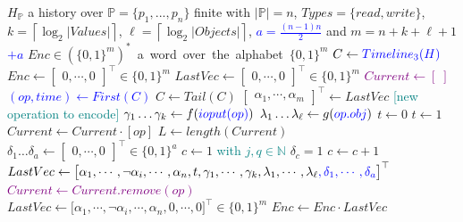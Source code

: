 \documentclass[12pt]{article}
\begin{document}
\begin{algorithm}[H]
\caption{Basic Timeline+TypesValuesObjects+Ar}\label{alg:basicTimelineTypesValuesAr}
\begin{algorithmic}[1]
\Require $H_\mathbb{P}$ a history over \mbox{$\mathbb{P}=\{p_1,...,p_n\}$} finite with $|\mathbb{P}|=n$, $Types=\{read,write\}$, \mbox{$k=\left\lceil \log_2 |Values| \right\rceil$}, \mbox{$\ell=\left\lceil \log_2 |Objects| \right\rceil$}, \textcolor{blue}{$a=\frac{(n-1)n}{2}$} and \mbox{$m=n+k+\ell+1$}\textcolor{blue}{$+a$}
\Ensure \mbox{$Enc\in(\{0,1\}^m)^*$ a word over the alphabet $\{0,1\}^m$}
\State $C \gets \textcolor{blue}{Timeline_3(H)}$
\State $Enc \gets \begin{bmatrix} 0 , \cdots , 0 \end{bmatrix}^\top\in \{0,1\}^m $
\State $LastVec\gets \begin{bmatrix} 0 , \cdots , 0 \end{bmatrix}^\top\in \{0,1\}^m$
\State \textcolor{purple}{$Current\gets [\;]$}
	\State \textcolor{blue}{$(op,time)\gets First(C)$}
	\State $C\gets Tail(C)$	
	\State $\begin{bmatrix}\alpha_1 , \cdots  , \alpha_m\end{bmatrix}^\top \gets LastVec$
	 \textcolor{teal}{[new operation to encode]}
		\State $\gamma_1\hdots\gamma_k\gets f(\textcolor{blue}{ioput(op)})$
		\State $\lambda_1\hdots\lambda_\ell\gets g(\textcolor{blue}{op.obj})$
			\State $t\gets 0$
		\Else
			\State $t\gets 1$
		\EndIf
		\color{purple}
		\State $Current\gets Current\cdot [op]$
		\State $L \gets length(Current)$
		\State $\delta_1\hdots \delta_a \gets \begin{bmatrix} 0 , \cdots , 0 \end{bmatrix}^\top\in \{0,1\}^a$
		\State $c \gets 1$
				 \textcolor{teal}{\quad with $j,q\in \mathbb{N}$}
						\State $\delta_c=1$
					\EndIf
					\State $c\gets c+1$
				\EndFor
			\EndFor
		\EndIf
		\color{black}
		\State $LastVec\gets\big[\alpha_1 , \cdots , \neg\alpha_i ,\cdots ,\alpha_n  ,t,\gamma_1 ,\cdots  ,\gamma_k,\lambda_1,\cdots,\lambda_\ell 
		\textcolor{blue}{,\delta_1,\cdots,\delta_a}\big]^\top$
	\Else
		\State \textcolor{purple}{$Current\gets Current.remove(op)$}
		\State $LastVec\gets\big[\alpha_1, \cdots , \neg\alpha_i , \cdots , \alpha_n,0,\cdots,0\big]^\top\in\{0,1\}^m$
	\EndIf
	\State $Enc\gets Enc\cdot LastVec$
\EndWhile
\end{algorithmic}
\end{algorithm}
\end{document}
